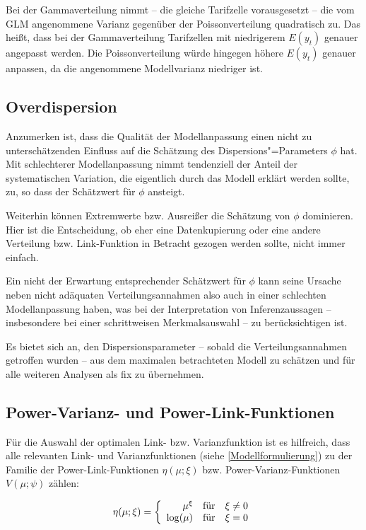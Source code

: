 Bei der Gammaverteilung nimmt – die gleiche Tarifzelle vorausgesetzt – die vom GLM angenommene Varianz gegenüber der Poissonverteilung quadratisch zu. Das heißt, dass bei der Gammaverteilung Tarifzellen mit niedrigerem  $E(y_t)$ genauer angepasst werden. Die Poissonverteilung würde hingegen höhere $E(y_t)$  genauer anpassen, da die angenommene Modellvarianz niedriger ist.


\subsection{Overdispersion} \label{Overdispersion}   

Anzumerken ist, dass die Qualität der Modellanpassung einen nicht zu unterschätzenden Einfluss auf die Schätzung des Dispersions"=Parameters $\phi$  hat. Mit schlechterer Modellanpassung nimmt tendenziell der Anteil der systematischen Variation, die eigentlich durch das Modell erklärt werden sollte, zu, so dass der Schätzwert für $\phi$  ansteigt.

Weiterhin können Extremwerte bzw. Ausreißer die Schätzung von $\phi$  dominieren. Hier ist die Entscheidung, ob eher eine Datenkupierung oder eine andere Verteilung bzw. Link-Funktion in Betracht gezogen werden sollte, nicht immer einfach.

Ein nicht der Erwartung entsprechender Schätzwert für $\phi$  kann seine Ursache neben nicht adäquaten Verteilungsannahmen also auch in einer schlechten Modellanpassung haben, was bei der Interpretation von Inferenzaussagen – insbesondere bei einer schrittweisen Merkmalsauswahl – zu berücksichtigen ist. 

Es bietet sich an, den Dispersionsparameter – sobald die Verteilungsannahmen getroffen wurden – aus dem maximalen betrachteten Modell zu schätzen und für alle weiteren Analysen als fix zu übernehmen.


\subsection{Power-Varianz- und Power-Link-Funktionen}

Für die Auswahl der optimalen Link- bzw. Varianzfunktion ist es hilfreich, dass alle relevanten Link- und Varianzfunktionen (siehe \ref{Modellformulierung}) zu der Familie der Power-Link-Funktionen $\eta(\mu;\xi)$  bzw. Power-Varianz-Funktionen $V(\mu;\psi)$  zählen:

\begin{eqnarray} \label{eq:8a}
\eta(\mu;\xi)=\left\{ \begin{array}{r@{\quad \textnormal{für} \quad}l}
\mu^\xi & \xi \neq 0\\
\log(\mu) & \xi = 0
\end{array} \right. 
\end{eqnarray}

